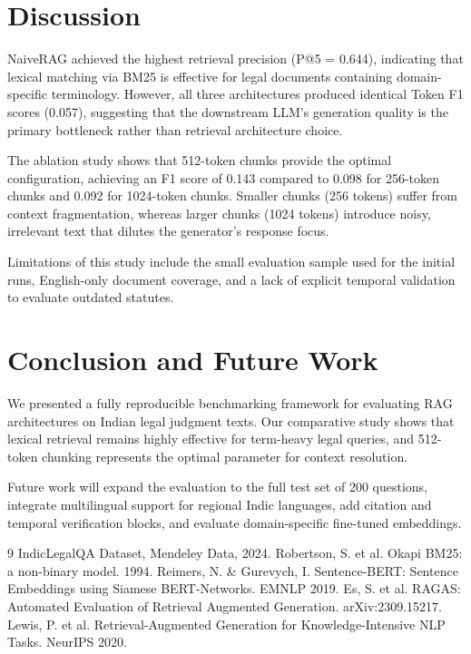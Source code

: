 \documentclass[11pt]{article}
\begin{document}
\section{Discussion}
NaiveRAG achieved the highest retrieval precision (P@5 = 0.644), indicating that lexical matching via BM25 is effective for legal documents containing domain-specific terminology. However, all three architectures produced identical Token F1 scores (0.057), suggesting that the downstream LLM's generation quality is the primary bottleneck rather than retrieval architecture choice.

The ablation study shows that 512-token chunks provide the optimal configuration, achieving an F1 score of 0.143 compared to 0.098 for 256-token chunks and 0.092 for 1024-token chunks. Smaller chunks (256 tokens) suffer from context fragmentation, whereas larger chunks (1024 tokens) introduce noisy, irrelevant text that dilutes the generator's response focus.

Limitations of this study include the small evaluation sample used for the initial runs, English-only document coverage, and a lack of explicit temporal validation to evaluate outdated statutes.

\section{Conclusion and Future Work}
We presented a fully reproducible benchmarking framework for evaluating RAG architectures on Indian legal judgment texts. Our comparative study shows that lexical retrieval remains highly effective for term-heavy legal queries, and 512-token chunking represents the optimal parameter for context resolution.

Future work will expand the evaluation to the full test set of 200 questions, integrate multilingual support for regional Indic languages, add citation and temporal verification blocks, and evaluate domain-specific fine-tuned embeddings.

\begin{thebibliography}{9}
 IndicLegalQA Dataset, Mendeley Data, 2024.
 Robertson, S. et al. Okapi BM25: a non-binary model. 1994.
 Reimers, N. \& Gurevych, I. Sentence-BERT: Sentence Embeddings using Siamese BERT-Networks. EMNLP 2019.
 Es, S. et al. RAGAS: Automated Evaluation of Retrieval Augmented Generation. arXiv:2309.15217.
 Lewis, P. et al. Retrieval-Augmented Generation for Knowledge-Intensive NLP Tasks. NeurIPS 2020.
\end{thebibliography}
\end{document}
